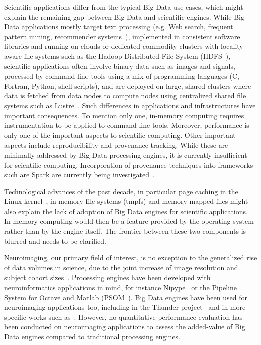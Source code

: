 \documentclass{IEEEtran}
\newcommand{\todo}[1]{\marginpar{\parbox{18mm}{\flushleft\tiny\color{red}\textbf{TODO}:
      #1}}}
\begin{document}
Scientific applications differ from the typical Big Data use 
cases, which might explain the remaining gap between Big Data and 
scientific engines. \todo{This sentence is extremely long} While Big Data applications mostly target text 
processing (e.g. Web search, frequent pattern mining, recommender 
systems~\cite{leskovec2014mining}), implemented in consistent software 
libraries and running on clouds or dedicated commodity clusters with 
locality-aware file systems such as the Hadoop Distributed File System 
(HDFS~\cite{shvachko2010hadoop}), scientific applications often involve 
binary data such as images and signals, processed by command-line tools 
using a mix of programming languages (C, Fortran, Python, shell 
scripts), and are deployed on large, shared clusters where 
data is fetched from data nodes to compute nodes using centralized shared file 
systems such as Lustre~\cite{schwan2003lustre}. Such differences in 
applications and infrastructures have important consequences. To 
mention only one, in-memory computing requires instrumentation to be 
applied to command-line tools. Moreover, performance is only one of the important
aspects to scientific computing. Other important aspects include reproducibility 
and provenance tracking. While these are minimally addressed by Big Data
processing engines, it is currently insufficient for scientific computing. 
Incorporation of provenance techniques into frameworks such are Spark are
currently being investigated~\cite{samba}.

Technological advances of the past decade, in particular page caching 
in the Linux kernel~\cite{love2010linux}, in-memory file systems 
(tmpfs) and memory-mapped files\todo{check that} might also 
explain the lack of adoption of Big Data engines for scientific 
applications.
In-memory computing would then be a feature provided by 
the operating system rather than by the engine itself. The frontier 
between these two components is blurred and needs to be clarified.



Neuroimaging, our primary field of interest, is no exception to the 
generalized rise of data volumes in science, due to the joint increase 
of image resolution and subject cohort sizes~\cite{van2014human}. 
Processing engines have been developed with neuroinformatics 
applications in mind, for instance Nipype~\cite{gorgolewski2011nipype} 
or the Pipeline System for Octave and Matlab 
(PSOM~\cite{bellec2012pipeline}). Big Data engines have been used for 
neuroimaging applications too, including in the Thunder 
project~\cite{freeman2014mapping} and in more specific works such 
as~\cite{makkie2019fast}. However, no quantitative performance 
evaluation has been conducted on neuroimaging applications to assess the 
added-value of Big Data engines compared to traditional processing engines.
\end{document}
